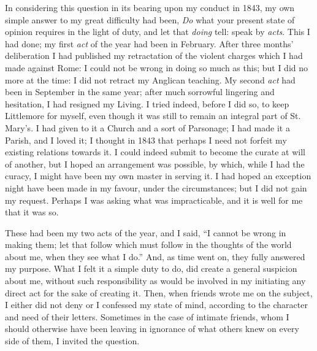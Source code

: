 In considering this question in its bearing upon my conduct in 1843,
my own simple answer to my great difficulty had been, \emph{Do} what
your present state of opinion requires in the light of duty, and
let that \emph{doing} tell: speak by \emph{acts}. This I had done;
my first \emph{act} of the year had been in February. After three
months' deliberation I had published my retractation of the
violent charges which I had made against Rome: I could not be wrong in
doing so much as this; but I did no more at the time: I did not
retract my Anglican teaching. My second \emph{act} had been in
September in the same year; after much sorrowful lingering and
hesitation, I had resigned my Living. I tried indeed, before
I did so, to keep Littlemore for myself, even though it was still to
remain an integral part of St. Mary's. I had given to it a Church
and a sort of Parsonage; I had made it a Parish, and I loved it; I thought in 1843 that
perhaps I need not forfeit my existing relations towards it. I could indeed
submit to become the curate at will of another, but I hoped an
arrangement was possible, by which, while I had the curacy, I might
have been my own master in serving it. I had hoped an exception night
have been made in my favour, under the circumstances; but I did not gain
my request. Perhaps I was asking what was impracticable, and
it is well for me that it was so.

These had been my two acts of the year, and I said, ``I
cannot be wrong in making them; let that follow which must follow in the
thoughts of the world about me, when they see what I do.'' And,
as time went on, they fully answered my purpose. What I felt it a simple duty to do,
did create a general suspicion about me,
without such responsibility as would be involved in my initiating any
direct act for the sake of creating it. Then, when friends wrote me on the
subject, I either did not deny or I confessed my state of mind, according to
the character and need of their letters. Sometimes in the case of
intimate friends, whom I should otherwise have been leaving in ignorance of
what others knew on every side of them, I invited the question.

